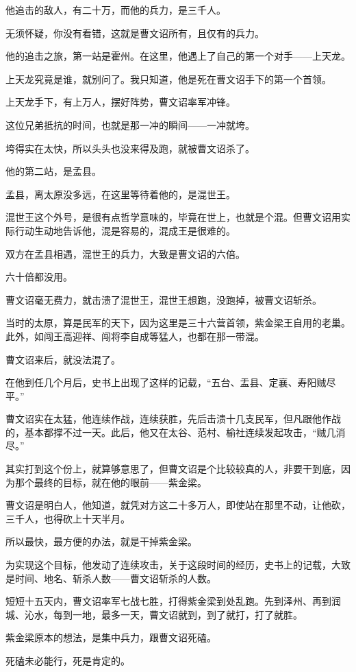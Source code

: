 \begin{multicols}{\theparacolNo}
他追击的敌人，有二十万，而他的兵力，是三千人。

无须怀疑，你没有看错，这就是曹文诏所有，且仅有的兵力。

他的追击之旅，第一站是霍州。在这里，他遇上了自己的第一个对手——上天龙。

上天龙究竟是谁，就别问了。我只知道，他是死在曹文诏手下的第一个首领。

上天龙手下，有上万人，摆好阵势，曹文诏率军冲锋。

这位兄弟抵抗的时间，也就是那一冲的瞬间——一冲就垮。

垮得实在太快，所以头头也没来得及跑，就被曹文诏杀了。

他的第二站，是孟县。

孟县，离太原没多远，在这里等待着他的，是混世王。

混世王这个外号，是很有点哲学意味的，毕竟在世上，也就是个混。但曹文诏用实际行动生动地告诉他，混是容易的，混成王是很难的。

双方在孟县相遇，混世王的兵力，大致是曹文诏的六倍。

六十倍都没用。

曹文诏毫无费力，就击溃了混世王，混世王想跑，没跑掉，被曹文诏斩杀。

当时的太原，算是民军的天下，因为这里是三十六营首领，紫金梁王自用的老巢。此外，如闯王高迎祥、闯将李自成等猛人，也都在那一带混。

曹文诏来后，就没法混了。

在他到任几个月后，史书上出现了这样的记载，“五台、盂县、定襄、寿阳贼尽平。”

曹文诏实在太猛，他连续作战，连续获胜，先后击溃十几支民军，但凡跟他作战的，基本都撑不过一天。此后，他又在太谷、范村、榆社连续发起攻击，“贼几消尽。”

其实打到这个份上，就算够意思了，但曹文诏是个比较较真的人，非要干到底，因为那个最终的目标，就在他的眼前——紫金梁。

曹文诏是明白人，他知道，就凭对方这二十多万人，即使站在那里不动，让他砍，三千人，也得砍上十天半月。

所以最快，最方便的办法，就是干掉紫金梁。

为实现这个目标，他发动了连续攻击，关于这段时间的经历，史书上的记载，大致是时间、地名、斩杀人数——曹文诏斩杀的人数。

短短十五天内，曹文诏率军七战七胜，打得紫金梁到处乱跑。先到泽州、再到润城、沁水，每到一地，最多一天，曹文诏就到，到了就打，打了就胜。

紫金梁原本的想法，是集中兵力，跟曹文诏死磕。

死磕未必能行，死是肯定的。


\end{multicols}
